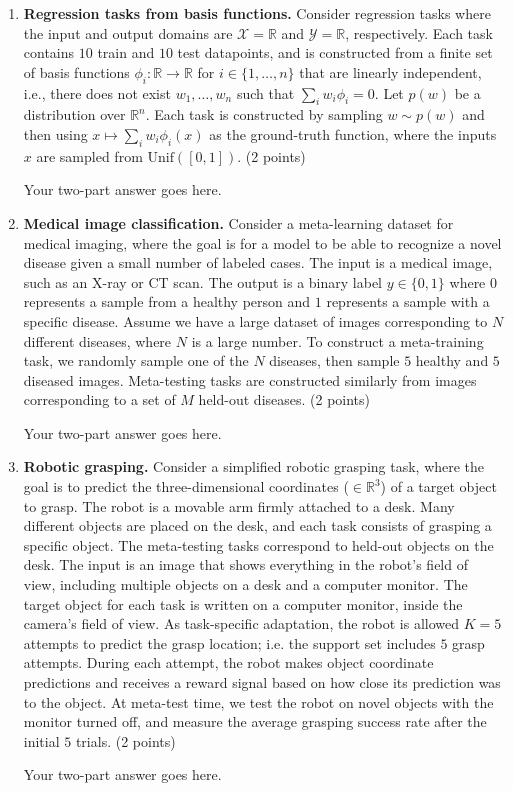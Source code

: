 \documentclass[12pt]{article}
\begin{document}
\begin{enumerate}[label=(\alph*)]
\item \textbf{Regression tasks from basis functions.}
Consider regression tasks where the input and output domains are $\mathcal{X} = \mathbb{R}$ and $\mathcal{Y} = \mathbb{R}$, respectively.
Each task contains $10$ train and $10$ test datapoints, and is constructed from a finite set of basis functions $\phi_i: \mathbb{R} \rightarrow \mathbb{R}$ for $i \in \{1, \ldots, n\}$ that are linearly independent, i.e., there does not exist $w_1, \ldots, w_n$ such that $\sum_i w_i \phi_i = 0$.
Let $p(w)$ be a distribution over $\mathbb{R}^n$. 
Each task is constructed by sampling $w \sim p(w)$ and then using $x \mapsto \sum_i w_i \phi_i(x)$ as the ground-truth function, where the inputs $x$ are sampled from $\textrm{Unif}([0, 1])$.
(2 points)

{\color{red}
Your two-part answer goes here.
}

\item \textbf{Medical image classification.}
Consider a meta-learning dataset for medical imaging, where the goal is for a model to be able to recognize a novel disease given a small number of labeled cases.
The input is a medical image, such as an X-ray or CT scan.
The output is a binary label $y \in \{0, 1\}$ where $0$ represents a sample from a healthy person and $1$ represents a sample with a specific disease.
Assume we have a large dataset of images corresponding to $N$ different diseases, where $N$ is a large number.
To construct a meta-training task, we randomly sample one of the $N$ diseases, then sample $5$ healthy and $5$ diseased images.
Meta-testing tasks are constructed similarly from images corresponding to a set of $M$ held-out diseases.
(2 points)

{\color{red}
Your two-part answer goes here.
}

\item \textbf{Robotic grasping.}
Consider a simplified robotic grasping task, where the goal is to predict the three-dimensional coordinates ($\in \mathbb{R}^3$) of a target object to grasp.
The robot is a movable arm firmly attached to a desk.
Many different objects are placed on the desk, and each task consists of grasping a specific object. The meta-testing tasks correspond to held-out objects on the desk.
The input is an image that shows everything in the robot's field of view, including multiple objects on a desk and a computer monitor.
The target object for each task is written on a computer monitor, inside the camera's field of view.
As task-specific adaptation, the robot is allowed $K=5$ attempts to predict the grasp location; i.e. the support set includes $5$ grasp attempts.
During each attempt, the robot makes object coordinate predictions and receives a reward signal based on how close its prediction was to the object.
At meta-test time, we test the robot on novel objects with the monitor turned off, and measure the average grasping success rate after the initial $5$ trials.
(2 points)

{\color{red}
Your two-part answer goes here.
}

\end{enumerate}
\end{document}
